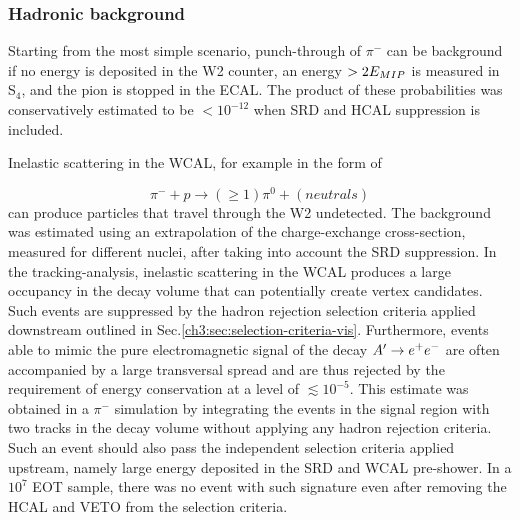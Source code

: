 \subsubsection{Hadronic background}
\label{ch3:sec:bkg:vis:hadr}

Starting from the most simple scenario, punch-through of $\pi^-$ can be background if no energy is deposited in the W2 counter, an energy $> 2E_{MIP}$ is measured in S$_4$, and the pion is stopped in the ECAL. The product of these probabilities was conservatively estimated to be $< 10^{-12}$ when SRD and HCAL suppression is included.

Inelastic scattering in the WCAL, for example in the form of

\begin{equation}
  \label{eq:vis-int-neutral}
  \pi^- + p \rightarrow (\geq 1)\pi^0 + (neutrals)
\end{equation}
can produce particles that travel through the W2 undetected. The background was estimated using an extrapolation of the charge-exchange cross-section, measured for different nuclei, after taking into account the SRD suppression. In the tracking-analysis, inelastic scattering in the WCAL produces a large occupancy in the decay volume that can potentially create vertex candidates. Such events are suppressed by the hadron rejection selection criteria applied downstream outlined in Sec.\ref{ch3:sec:selection-criteria-vis}. Furthermore, events able to mimic the pure electromagnetic signal of the decay $A' \rightarrow e^+ e^-$ are often accompanied by a large transversal spread and are thus rejected by the requirement of energy conservation at a level of $\lesssim 10^{-5}$. This estimate was obtained in a $\pi^-$ simulation by integrating the events in the signal region with two tracks in the decay volume without applying any hadron rejection criteria. Such an event should also pass the independent selection criteria applied upstream, namely large energy deposited in the SRD and WCAL pre-shower. In a $10^7$ EOT sample, there was no event with such signature even after removing the HCAL and VETO from the selection criteria.

